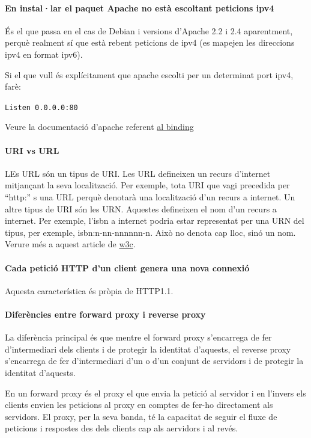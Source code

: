 \documentclass[a4paper, 11pt]{article}
\begin{document}
\paragraph{En instal·lar el paquet Apache no està escoltant peticions ipv4 } 
És el que passa en el cas de Debian i versions d'Apache 2.2 i 2.4 aparentment, perquè realment sí que està rebent peticions de ipv4 (es mapejen les direccions ipv4 en format ipv6). 

Si el que vull \'es explícitament que apache escolti per un determinat port ipv4, farè:

\verb+Listen 0.0.0.0:80+

Veure la documentació d'apache referent \href{http://httpd.apache.org/docs/2.4/bind.html}{al binding}\cite{DOC}

\paragraph{URI vs URL}
LEs URL són un tipus de URI. Les URL defineixen un recurs d'internet mitjançant la seva localització. Per exemple, tota URI que vagi precedida per “http:” s una URL perquè denotarà una localització d'un recurs a internet. 
Un altre tipus de URI són les URN. Aquestes defineixen el nom d'un recurs a internet. Per exemple, l'isbn a internet podria estar representat per una URN del tipus, per exemple, isbn:n-nn-nnnnnn-n. Això no denota cap lloc, sinó un nom.
Verure m\'es a aquest article de \href{http://www.w3.org/TR/uri-clarification/}{w3c}\cite{w3c}.

\paragraph{Cada petició HTTP d'un client genera una nova connexió}
Aquesta característica \'es pròpia de HTTP1.1.

\paragraph{Diferències entre forward proxy i reverse proxy}
La diferència principal \'es que mentre el forward proxy s'encarrega de fer d'intermediari dels clients i de protegir la identitat d'aquests, el reverse proxy s'encarrega de fer d'intermediari d'un o d'un conjunt de servidors i de protegir la identitat d'aquests.

En un forward proxy \'es el proxy el que envia la petició al servidor i en l'invers els clients envien les peticions al proxy en comptes de fer-ho directament als servidors. El proxy, per la seva banda, t\'e la capacitat de seguir el fluxe de peticions i respostes des dels clients cap als aervidors i al rev\'es.
\end{document}
